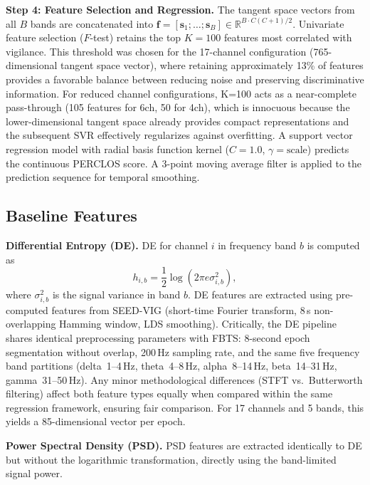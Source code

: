 \documentclass{iopjournal}
\begin{document}
\noindent\textbf{Step 4: Feature Selection and Regression.} The tangent space vectors from all $B$ bands are concatenated into $\mathbf{f} = [\mathbf{s}_1; \ldots; \mathbf{s}_B] \in \mathbb{R}^{B \cdot C(C+1)/2}$. Univariate feature selection ($F$-test) retains the top $K=100$ features most correlated with vigilance. This threshold was chosen for the 17-channel configuration (765-dimensional tangent space vector), where retaining approximately 13\% of features provides a favorable balance between reducing noise and preserving discriminative information. For reduced channel configurations, K=100 acts as a near-complete pass-through (105 features for 6ch, 50 for 4ch), which is innocuous because the lower-dimensional tangent space already provides compact representations and the subsequent SVR effectively regularizes against overfitting. A support vector regression model with radial basis function kernel ($C=1.0$, $\gamma=\text{scale}$) predicts the continuous PERCLOS score. A 3-point moving average filter is applied to the prediction sequence for temporal smoothing.

\subsection{Baseline Features}

\noindent\textbf{Differential Entropy (DE).} DE for channel $i$ in frequency band $b$ is computed as
\begin{equation}
  h_{i,b} = \frac{1}{2} \log (2\pi e \sigma_{i,b}^2),
\end{equation}
where $\sigma_{i,b}^2$ is the signal variance in band $b$. DE features are extracted using pre-computed features from SEED-VIG (short-time Fourier transform, 8\,s non-overlapping Hamming window, LDS smoothing). Critically, the DE pipeline shares identical preprocessing parameters with FBTS: 8-second epoch segmentation without overlap, 200\,Hz sampling rate, and the same five frequency band partitions (delta~1--4\,Hz, theta~4--8\,Hz, alpha~8--14\,Hz, beta~14--31\,Hz, gamma~31--50\,Hz). Any minor methodological differences (STFT vs.\ Butterworth filtering) affect both feature types equally when compared within the same regression framework, ensuring fair comparison. For 17 channels and 5 bands, this yields a 85-dimensional vector per epoch.

\noindent\textbf{Power Spectral Density (PSD).} PSD features are extracted identically to DE but without the logarithmic transformation, directly using the band-limited signal power.
\end{document}
